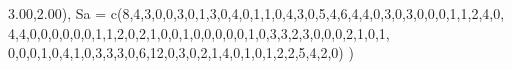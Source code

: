 \documentclass[
  letterpaper,
  DIV=11,
  numbers=noendperiod]{scrartcl}
\newenvironment{Shaded}{\begin{snugshade}}{\end{snugshade}}
\newcommand{\AttributeTok}[1]{\textcolor[rgb]{0.40,0.45,0.13}{#1}}
\newcommand{\DecValTok}[1]{\textcolor[rgb]{0.68,0.00,0.00}{#1}}
\newcommand{\FloatTok}[1]{\textcolor[rgb]{0.68,0.00,0.00}{#1}}
\newcommand{\FunctionTok}[1]{\textcolor[rgb]{0.28,0.35,0.67}{#1}}
\newcommand{\NormalTok}[1]{\textcolor[rgb]{0.00,0.23,0.31}{#1}}
\begin{document}
\begin{Shaded}
\begin{Highlighting}[]
         \FloatTok{3.00}\NormalTok{,}\FloatTok{2.00}\NormalTok{),}
  \AttributeTok{Sa =} \FunctionTok{c}\NormalTok{(}\DecValTok{8}\NormalTok{,}\DecValTok{4}\NormalTok{,}\DecValTok{3}\NormalTok{,}\DecValTok{0}\NormalTok{,}\DecValTok{0}\NormalTok{,}\DecValTok{3}\NormalTok{,}\DecValTok{0}\NormalTok{,}\DecValTok{1}\NormalTok{,}\DecValTok{3}\NormalTok{,}\DecValTok{0}\NormalTok{,}\DecValTok{4}\NormalTok{,}\DecValTok{0}\NormalTok{,}\DecValTok{1}\NormalTok{,}\DecValTok{1}\NormalTok{,}\DecValTok{0}\NormalTok{,}\DecValTok{4}\NormalTok{,}\DecValTok{3}\NormalTok{,}\DecValTok{0}\NormalTok{,}\DecValTok{5}\NormalTok{,}\DecValTok{4}\NormalTok{,}\DecValTok{6}\NormalTok{,}\DecValTok{4}\NormalTok{,}\DecValTok{4}\NormalTok{,}\DecValTok{0}\NormalTok{,}\DecValTok{3}\NormalTok{,}\DecValTok{0}\NormalTok{,}\DecValTok{3}\NormalTok{,}\DecValTok{0}\NormalTok{,}\DecValTok{0}\NormalTok{,}\DecValTok{0}\NormalTok{,}\DecValTok{1}\NormalTok{,}\DecValTok{1}\NormalTok{,}\DecValTok{2}\NormalTok{,}\DecValTok{4}\NormalTok{,}\DecValTok{0}\NormalTok{,}
         \DecValTok{4}\NormalTok{,}\DecValTok{4}\NormalTok{,}\DecValTok{0}\NormalTok{,}\DecValTok{0}\NormalTok{,}\DecValTok{0}\NormalTok{,}\DecValTok{0}\NormalTok{,}\DecValTok{0}\NormalTok{,}\DecValTok{0}\NormalTok{,}\DecValTok{1}\NormalTok{,}\DecValTok{1}\NormalTok{,}\DecValTok{2}\NormalTok{,}\DecValTok{0}\NormalTok{,}\DecValTok{2}\NormalTok{,}\DecValTok{1}\NormalTok{,}\DecValTok{0}\NormalTok{,}\DecValTok{0}\NormalTok{,}\DecValTok{1}\NormalTok{,}\DecValTok{0}\NormalTok{,}\DecValTok{0}\NormalTok{,}\DecValTok{0}\NormalTok{,}\DecValTok{0}\NormalTok{,}\DecValTok{0}\NormalTok{,}\DecValTok{1}\NormalTok{,}\DecValTok{0}\NormalTok{,}\DecValTok{3}\NormalTok{,}\DecValTok{3}\NormalTok{,}\DecValTok{2}\NormalTok{,}\DecValTok{3}\NormalTok{,}\DecValTok{0}\NormalTok{,}\DecValTok{0}\NormalTok{,}\DecValTok{0}\NormalTok{,}\DecValTok{2}\NormalTok{,}\DecValTok{1}\NormalTok{,}\DecValTok{0}\NormalTok{,}\DecValTok{1}\NormalTok{,}
         \DecValTok{0}\NormalTok{,}\DecValTok{0}\NormalTok{,}\DecValTok{0}\NormalTok{,}\DecValTok{1}\NormalTok{,}\DecValTok{0}\NormalTok{,}\DecValTok{4}\NormalTok{,}\DecValTok{1}\NormalTok{,}\DecValTok{0}\NormalTok{,}\DecValTok{3}\NormalTok{,}\DecValTok{3}\NormalTok{,}\DecValTok{3}\NormalTok{,}\DecValTok{0}\NormalTok{,}\DecValTok{6}\NormalTok{,}\DecValTok{12}\NormalTok{,}\DecValTok{0}\NormalTok{,}\DecValTok{3}\NormalTok{,}\DecValTok{0}\NormalTok{,}\DecValTok{2}\NormalTok{,}\DecValTok{1}\NormalTok{,}\DecValTok{4}\NormalTok{,}\DecValTok{0}\NormalTok{,}\DecValTok{1}\NormalTok{,}\DecValTok{0}\NormalTok{,}\DecValTok{1}\NormalTok{,}\DecValTok{2}\NormalTok{,}\DecValTok{2}\NormalTok{,}\DecValTok{5}\NormalTok{,}\DecValTok{4}\NormalTok{,}\DecValTok{2}\NormalTok{,}\DecValTok{0}\NormalTok{)}
\NormalTok{)}
\end{Highlighting}
\end{Shaded}
\end{document}
